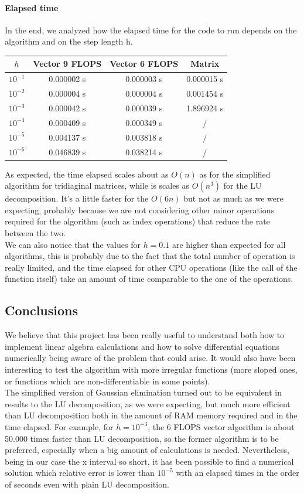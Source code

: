 \documentclass[10pt,a4paper,titlepage]{article}
\begin{document}
\paragraph{Elapsed time}
In the end, we analyzed how the elapsed time for the code to run depends on the algorithm and on the step length h. 
\begin{center}
\begin{tabular}{ |c|c|c|c| }
\hline
$h$ & Vector 9 FLOPS & Vector 6 FLOPS & Matrix \\\hline
  $10^{-1}$      & 0.000002 s& 0.000003 s& 0.000015 s \\\hline
  $10^{-2}$    & 0.000004 s& 0.000004 s& 0.001454 s \\\hline
  $10^{-3}$  & 0.000042 s& 0.000039 s& 1.896924 s \\\hline
  $10^{-4}$ & 0.000409 s& 0.000349 s& $/$\\\hline
  $10^{-5}$ & 0.004137 s& 0.003818 s& $/$\\\hline
  $10^{-6}$ & 0.046839 s& 0.038214 s& $/$\\\hline
\end{tabular}
\end{center}
As expected, the time elapsed scales about as $O(n)$ as for the simplified algorithm for tridiaginal matrices,  while is scales as $O(n^3)$ for the LU decomposition.  It's a little faster for the $O(6n)$ but not as much as we were expecting, probably because we are not considering other minor operations required for the algorithm (such as index operations) that reduce the rate between the two. \\
We can also notice that the values for $h = 0.1$ are higher than expected for all algorithms, this is probably due to the fact that the total number of operation is really limited, and the time elapsed for other CPU operations (like the call of the function itself) take an amount of time comparable to the one of the operations.

\subsection*{Conclusions}
We believe that this project has been really useful to understand both how to implement linear algebra calculations and how to solve differential equations numerically being aware of the problem that could arise. It would also have been interesting to test the algorithm with more irregular functions (more sloped ones, or functions which are non-differentiable in some points).\\
The simplified version of Gaussian elimination turned out to be equivalent in results to the LU decomposition, as we were expecting, but much more efficient than LU decomposition both in the amount of RAM memory required and in the time elapsed. For example, for $h=10^{-3}$, the 6 FLOPS vector algorithm is about 50.000 times faster than LU decomposition, so the former algorithm is to be preferred, especially when a big amount of calculations is needed.
Nevertheless, being in our case the x interval so short, it has been possible to find a numerical solution which relative error is lower than $10^{-5}$ with an elapsed times in the order of seconds even with plain LU decomposition.
\end{document}
